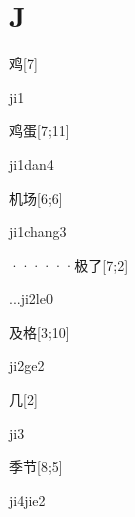 ﻿%
\section*{J}

\begin{verbete}[ji1]{鸡}[7]
\begin{pronuncia}{ji1}
\end{pronuncia}
\end{verbete}

\begin{verbete}[ji1dan4]{鸡蛋}[7;11]
\begin{pronuncia}{ji1dan4}
\end{pronuncia}
\end{verbete}

\begin{verbete}[ji1chang3]{机场}[6;6]
\begin{pronuncia}{ji1chang3}
\end{pronuncia}
\end{verbete}

\begin{verbete}[...ji2le0]{······极了}[7;2]
\begin{pronuncia}{...ji2le0}
\end{pronuncia}
\end{verbete}

\begin{verbete}[ji2ge2]{及格}[3;10]
\begin{pronuncia}{ji2ge2}
\end{pronuncia}
\end{verbete}

\begin{verbete}[ji3]{几}[2]
\begin{pronuncia}{ji3}
\end{pronuncia}
\end{verbete}

\begin{verbete}[ji4jie2]{季节}[8;5]
\begin{pronuncia}{ji4jie2}
\end{pronuncia}
\end{verbete}

